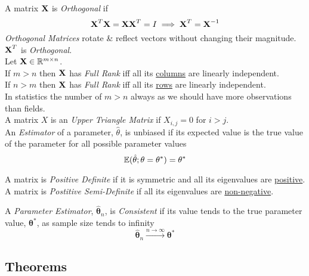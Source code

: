\documentclass[11pt,a4paper]{article}
\begin{document}
A matrix $\textbf{X}$ is \textit{Orthogonal} if
$$\textbf{X}^T\textbf{X}=\textbf{X}\textbf{X}^T=I\implies\textbf{X}^T=\textbf{X}^{-1}$$
\textit{Orthogonal Matrices} rotate \& reflect vectors without changing their magnitude.\\
\nb $\textbf{X}^T$ is \textit{Orthogonal}.\\

Let $\textbf{X}\in\mathbb{R}^{m\times n}$.\\
If $m>n$ then $\textbf{X}$ has \textit{Full Rank} iff all its \underline{columns} are linearly independent.\\
If $n>m$ then $\textbf{X}$ has \textit{Full Rank} iff all its \underline{rows} are linearly independent.\\
\nb In statistics the number of $m>n$ always as we should have more observations than fields.\\

A matrix $X$ is an \textit{Upper Triangle Matrix} if $X_{i,j}=0$ for $i>j$.\\

An \textit{Estimator} of a parameter, $\hat\theta$, is unbiased if its expected value is the true value of the parameter for all possible parameter values
$$\mathbb{E}(\hat\theta;\theta=\theta^*)=\theta^*$$


A matrix is \textit{Positive Definite} if it is symmetric and all its eigenvalues are \underline{positive}.\\

A matrix is \textit{Postitive Semi-Definite} if all its eigenvalues are \underline{non-negative}.


A \textit{Parameter Estimator}, $\hat{\pmb\theta}_n$, is \textit{Consistent} if its value tends to the true parameter value, $\pmb\theta^*$, as sample size tends to infinity
$$\hat{\pmb\theta}_n\overset{n\to\infty}{\longrightarrow}\pmb\theta^*$$

\subsection{Theorems}
\end{document}
